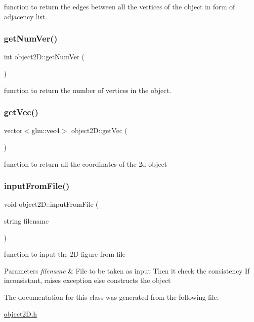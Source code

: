function to return the edges between all the vertices of the object in form of adjacency list. \mbox{\label{classobject2D_a957470b9b7c66bf1def476cd4b7d5fde}} 
\subsubsection{\texorpdfstring{get\+Num\+Ver()}{getNumVer()}}
{\footnotesize\ttfamily int object2\+D\+::get\+Num\+Ver (\begin{DoxyParamCaption}{ }\end{DoxyParamCaption})}

function to return the number of vertices in the object. \mbox{\label{classobject2D_a529cdc088990e491fef49b97f58c9a5a}} 
\subsubsection{\texorpdfstring{get\+Vec()}{getVec()}}
{\footnotesize\ttfamily vector$<$glm\+::vec4$>$ object2\+D\+::get\+Vec (\begin{DoxyParamCaption}{ }\end{DoxyParamCaption})}

function to return all the coordinates of the 2d object \mbox{\label{classobject2D_a6697aecc21bb2348fb81950cc0d83c83}} 
\subsubsection{\texorpdfstring{input\+From\+File()}{inputFromFile()}}
{\footnotesize\ttfamily void object2\+D\+::input\+From\+File (\begin{DoxyParamCaption}\item[{string}]{filename }\end{DoxyParamCaption})}

function to input the 2D figure from file 
\begin{DoxyParams}{Parameters}
{\em filename} & File to be taken as input Then it check the consistency If inconsistant, raises exception else constructs the object \\
\hline
\end{DoxyParams}


The documentation for this class was generated from the following file\+:\begin{DoxyCompactItemize}
\item 
\mbox{\hyperlink{object2D_8h}{object2\+D.\+h}}\end{DoxyCompactItemize}
